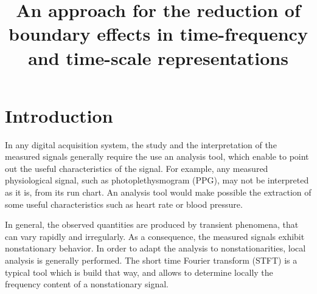 \documentclass[twoside,letterpaper]{article}
\title{An approach for the reduction of boundary effects in time-frequency and time-scale representations}
\date{}
\begin{document}
\maketitle

\section{Introduction}
In any digital acquisition system, the study and the interpretation of the measured signals generally require the use an analysis tool, which enable to point out the useful characteristics of the signal. For example, any  measured physiological signal, such as photoplethysmogram (PPG), may not be interpreted as it is, from its run chart. An analysis tool would make possible the extraction of some useful characteristics such as heart rate or blood pressure. 

In general, the observed quantities are produced by transient phenomena, that can vary rapidly and irregularly. As a consequence, the measured signals exhibit nonstationary behavior. In order to adapt the analysis to nonstationarities, local analysis is generally performed. The short time Fourier transform (STFT) is a typical tool which is build that way, and allows to determine locally the frequency content of a nonstationary signal.
\end{document}
